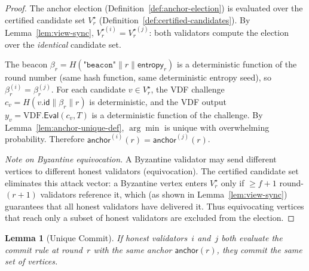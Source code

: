 \documentclass[11pt,a4paper]{article}
\newtheorem{lemma}[theorem]{Lemma}
\theoremstyle{definition}
\theoremstyle{remark}
\newcommand{\VDF}{\mathrm{VDF}}
\newcommand{\anchor}{\mathsf{anchor}}
\begin{document}
\begin{proof}
The anchor election (Definition~\ref{def:anchor-election}) is evaluated
over the certified candidate set $V_r^{\star}$
(Definition~\ref{def:certified-candidates}).
By Lemma~\ref{lem:view-sync}, $V_r^{\star(i)} = V_r^{\star(j)}$:
both validators compute the election over the \emph{identical} candidate set.

The beacon $\beta_r = H(\texttt{"beacon"} \| r \| \mathsf{entropy}_r)$
is a deterministic function of the round number (same hash function,
same deterministic entropy seed), so $\beta_r^{(i)} = \beta_r^{(j)}$.
For each candidate $v \in V_r^{\star}$, the VDF challenge
$c_v = H(v.\mathsf{id} \| \beta_r \| r)$ is deterministic, and the VDF
output $y_v = \VDF.\mathsf{Eval}(c_v, T)$ is a deterministic function
of the challenge.
By Lemma~\ref{lem:anchor-unique-def}, $\arg\min$ is unique with
overwhelming probability.
Therefore $\anchor^{(i)}(r) = \anchor^{(j)}(r)$.

\emph{Note on Byzantine equivocation.}
A Byzantine validator may send different vertices to different honest
validators (equivocation).
The certified candidate set eliminates this attack vector: a Byzantine
vertex enters $V_r^{\star}$ only if $\geq f+1$ round-$(r\!+\!1)$
validators reference it, which (as shown in Lemma~\ref{lem:view-sync})
guarantees that all honest validators have delivered it.
Thus equivocating vertices that reach only a subset of honest validators
are excluded from the election.
\end{proof}

\begin{lemma}[Unique Commit]\label{lem:unique-commit}
If honest validators~$i$ and~$j$ both evaluate the commit rule at
round~$r$ with the same anchor $\anchor(r)$, they commit the same set
of vertices.
\end{lemma}
\end{document}
